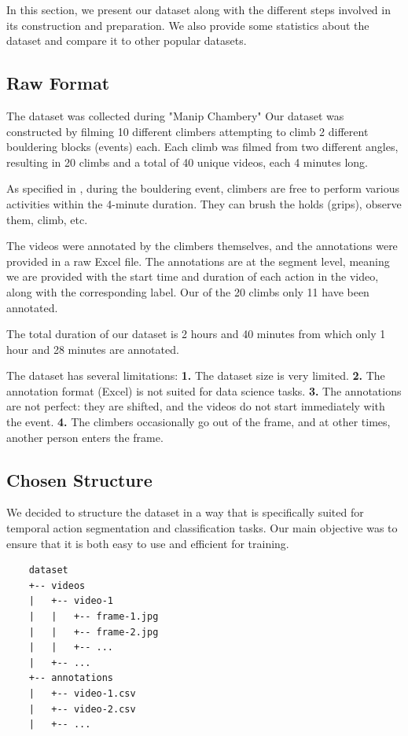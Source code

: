 In this section, we present our dataset along with the different steps involved in its construction and preparation. We also provide some statistics about the dataset and compare it to other popular datasets.

\subsection{Raw Format}

The dataset was collected during "Manip Chambery" Our dataset was constructed by filming 10 different climbers attempting to climb 2 different bouldering blocks (events) each. Each climb was filmed from two different angles, resulting in 20 climbs and a total of 40 unique videos, each 4 minutes long.

As specified in \cite{section:context}, during the bouldering event, climbers are free to perform various activities within the 4-minute duration. They can brush the holds (grips), observe them, climb, etc.

The videos were annotated by the climbers themselves, and the annotations were provided in a raw Excel file. The annotations are at the segment level, meaning we are provided with the start time and duration of each action in the video, along with the corresponding label. Our of the 20 climbs only 11 have been annotated.

The total duration of our dataset is 2 hours and 40 minutes from which only 1 hour and 28 minutes are annotated.

The dataset has several limitations: \textbf{1.} The dataset size is very limited. \textbf{2.} The annotation format (Excel) is not suited for data science tasks. \textbf{3.} The annotations are not perfect: they are shifted, and the videos do not start immediately with the event. \textbf{4.} The climbers occasionally go out of the frame, and at other times, another person enters the frame.

\subsection{Chosen Structure}

We decided to structure the dataset in a way that is specifically suited for temporal action segmentation and classification tasks. Our main objective was to ensure that it is both easy to use and efficient for training.

\begin{verbatim}
    dataset
    +-- videos
    |   +-- video-1
    |   |   +-- frame-1.jpg
    |   |   +-- frame-2.jpg
    |   |   +-- ...
    |   +-- ...
    +-- annotations
    |   +-- video-1.csv
    |   +-- video-2.csv
    |   +-- ...
\end{verbatim}

